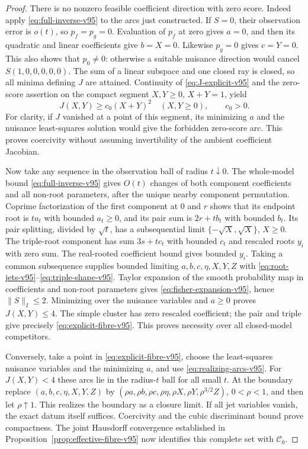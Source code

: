 \begin{proof}
There is no nonzero feasible coefficient direction with zero score.
Indeed apply \eqref{eq:full-inverse-v95} to the arcs just constructed.
If $S=0$, their observation error is $o(t)$, so $p_f=p_g=0$.
Evaluation of $p_f$ at zero gives $a=0$, and then its quadratic and
linear coefficients give $b=X=0$. Likewise $p_g=0$ gives $c=Y=0$.
This also shows that $p_0\ne0$: otherwise a suitable nuisance direction
would cancel $S(1,0,0,0,0,0)$. The sum of a linear subspace and one
closed ray is closed, so all minima defining $J$ are attained.
Continuity of \eqref{eq:J-explicit-v95} and the zero-score assertion
on the compact segment $X,Y\ge0$, $X+Y=1$, yield
\begin{equation}\label{eq:coercivity-v95}
 J(X,Y)\ge c_0(X+Y)^2\quad(X,Y\ge0),\qquad c_0>0.
\end{equation}
For clarity, if $J$ vanished at a point of this segment, its minimizing
$a$ and the nuisance least-squares solution would give the forbidden
zero-score arc. This proves coercivity without assuming invertibility
of the ambient coefficient Jacobian.

Now take any sequence in the observation ball of radius $t\downarrow0$.
The whole-model bound \eqref{eq:full-inverse-v95} gives $O(t)$ changes
of both component coefficients and all non-root parameters, after the
unique nearby component permutation. Coprime factorization of the
first component at $0$ and $r$ shows that its endpoint root is $t a_t$
with bounded $a_t\ge0$, and its pair sum is $2r+t b_t$ with bounded
$b_t$. Its pair splitting, divided by $\sqrt t$, has a subsequential
limit $\{-\sqrt X,\sqrt X\}$, $X\ge0$. The triple-root component
has sum $3s+t c_t$ with bounded $c_t$ and rescaled roots $y_i$ with
zero sum. The real-rooted coefficient bound gives bounded $y_i$.
Taking a common subsequence supplies bounded limiting $a,b,c,\eta,X,Y,Z$
with \eqref{eq:root-jets-v95}--\eqref{eq:triple-shape-v95}.
Taylor expansion of the smooth probability map in coefficients and
non-root parameters gives \eqref{eq:fisher-expansion-v95}, hence
$\|S\|_I\le2$. Minimizing over the nuisance variables and $a\ge0$
proves $J(X,Y)\le4$. The simple cluster has zero rescaled coefficient;
the pair and triple give precisely \eqref{eq:explicit-fibre-v95}.
This proves necessity over all closed-model competitors.

Conversely, take a point in \eqref{eq:explicit-fibre-v95}, choose the
least-squares nuisance variables and the minimizing $a$, and use
\eqref{eq:realizing-arcs-v95}. For $J(X,Y)<4$ these arcs lie in the
radius-$t$ ball for all small $t$. At the boundary replace
$(a,b,c,\eta,X,Y,Z)$ by
$(\rho a,\rho b,\rho c,\rho\eta,\rho X,\rho Y,\rho^{3/2}Z)$,
$0<\rho<1$, and then let $\rho\uparrow1$. This realizes the boundary
as a closure limit. If all jet variables vanish, the exact datum
itself suffices. Coercivity and the cubic discriminant bound prove
compactness. The joint Hausdorff convergence established in
Proposition~\ref{prop:effective-fibre-v95} now identifies this complete
set with $\mathscr C_0$.
\end{proof}

